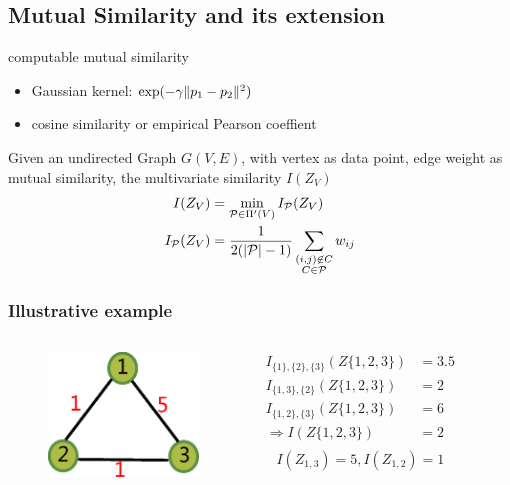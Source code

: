 \documentclass{beamer}
\DeclarePairedDelimiter\abs{\lvert}{\rvert}
\DeclarePairedDelimiter\norm{\lVert}{\rVert}
\begin{document}
\subsection{Mutual Similarity and its extension}
\begin{frame}
\begin{block}{computable mutual similarity}
\begin{itemize}
\item Gaussian kernel: $ \exp({-\gamma \norm{p_1 - p_2}^2})$
\item cosine similarity or empirical Pearson coeffient 
\end{itemize}
\end{block}

\begin{definition}
Given an undirected Graph $G(V, E)$, with vertex as data point, edge weight as mutual similarity, the multivariate similarity $I(Z_V)$
\begin{align}
I(Z_V) & = \min_{\mathcal{P} \in \Pi'(V)} I_{\mathcal{P}}(Z_V) \\
\label{eq:newDef}  I_{\mathcal{P}}(Z_V) & = {1 \over 2 ( \abs{\mathcal{P}} - 1) } \sum_{\substack{(i,j) \not\in C\\ C\in \mathcal{P}}} w_{ij}
\end{align}
\end{definition}
\end{frame}
\begin{frame}
\frametitle{Illustrative example}
\begin{columns}
\column{5cm}
\begin{figure}
\includegraphics[width=4cm]{pic/example.eps}
\end{figure}
\column{5cm}
\begin{align*}
I_{\{1\},\{2\},\{3\}}(Z\{1,2,3\}) & = 3.5 \\
I_{\{1,3\},\{2\}}(Z\{1,2,3\}) & = 2 \\ 
I_{\{1,2\},\{3\}}(Z\{1,2,3\}) & = 6 \\ 
\Rightarrow I(Z\{1,2,3\}) & = 2 \\
\end{align*}
\begin{equation*}
I(Z_{1,3}) = 5, I(Z_{1,2}) = 1
\end{equation*}
\end{columns}
\end{frame}
\end{document}
